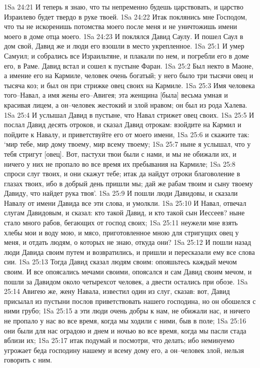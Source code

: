 1Sa 24:21  И теперь я знаю, что ты непременно будешь царствовать, и царство Израилево будет твердо в руке твоей.
1Sa 24:22  Итак поклянись мне Господом, что ты не искоренишь потомства моего после меня и не уничтожишь имени моего в доме отца моего.
1Sa 24:23  И поклялся Давид Саулу. И пошел Саул в дом свой, Давид же и люди его взошли в место укрепленное.
1Sa 25:1  И умер Самуил; и собрались все Израильтяне, и плакали по нем, и погребли его в доме его, в Раме. Давид встал и сошел к пустыне Фаран.
1Sa 25:2  Был некто в Маоне, а имение его на Кармиле, человек очень богатый; у него было три тысячи овец и тысяча коз; и был он при стрижке овец своих на Кармиле.
1Sa 25:3  Имя человека того--Навал, а имя жены его--Авигея; эта женщина [была] весьма умная и красивая лицем, а он--человек жестокий и злой нравом; он был из рода Халева.
1Sa 25:4  И услышал Давид в пустыне, что Навал стрижет овец своих.
1Sa 25:5  И послал Давид десять отроков, и сказал Давид отрокам: взойдите на Кармил и пойдите к Навалу, и приветствуйте его от моего имени,
1Sa 25:6  и скажите так: `мир тебе, мир дому твоему, мир всему твоему;
1Sa 25:7  ныне я услышал, что у тебя стригут [овец]. Вот, пастухи твои были с нами, и мы не обижали их, и ничего у них не пропало во все время их пребывания на Кармиле;
1Sa 25:8  спроси слуг твоих, и они скажут тебе; итак да найдут отроки благоволение в глазах твоих, ибо в добрый день пришли мы; дай же рабам твоим и сыну твоему Давиду, что найдет рука твоя'.
1Sa 25:9  И пошли люди Давидовы, и сказали Навалу от имени Давида все эти слова, и умолкли.
1Sa 25:10  И Навал, отвечал слугам Давидовым, и сказал: кто такой Давид, и кто такой сын Иессеев? ныне стало много рабов, бегающих от господ своих;
1Sa 25:11  неужели мне взять хлебы мои и воду мою, и мясо, приготовленное мною для стригущих овец у меня, и отдать людям, о которых не знаю, откуда они?
1Sa 25:12  И пошли назад люди Давида своим путем и возвратились, и пришли и пересказали ему все слова сии.
1Sa 25:13  Тогда Давид сказал людям своим: опояшьтесь каждый мечом своим. И все опоясались мечами своими, опоясался и сам Давид своим мечом, и пошли за Давидом около четырехсот человек, а двести остались при обозе.
1Sa 25:14  Авигею же, жену Навала, известил один из слуг, сказав: вот, Давид присылал из пустыни послов приветствовать нашего господина, но он обошелся с ними грубо;
1Sa 25:15  а эти люди очень добры к нам, не обижали нас, и ничего не пропало у нас во все время, когда мы ходили с ними, быв в поле;
1Sa 25:16  они были для нас оградою и днем и ночью во все время, когда мы пасли стада вблизи их;
1Sa 25:17  итак подумай и посмотри, что делать; ибо неминуемо угрожает беда господину нашему и всему дому его, а он--человек злой, нельзя говорить с ним.
